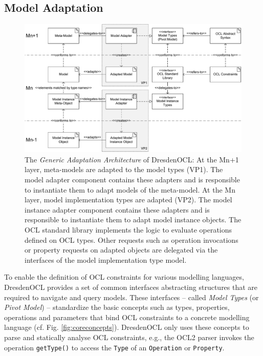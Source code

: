 \subsection{Model Adaptation}

	\begin{figure}[!t]
			\centering
				\includegraphics[width=1.00\textwidth]{figures/modeladaptation.pdf}
			\caption{The \emph{Generic Adaptation Architecture} of DresdenOCL: At the Mn+1 layer, meta-models are adapted
			to the model types (VP1). The model adapter component contains these adapters and is responsible 
			to instantiate them to adapt models of the meta-model. 
			At the Mn layer, model implementation types are adapted (VP2). The model instance adapter component
			contains these adapters and is responsible to instantiate them to adapt model instance objects. 
			The OCL standard library implements the logic to evaluate operations defined on OCL types. Other 
			requests such as operation invocations or property requests on adapted objects are delegated 
			via the interfaces of the model implementation type model.}
			\label{fig:modeladaptation}
		\end{figure}

	To enable the definition of OCL constraints for various modelling languages,
	DresdenOCL provides a set of common interfaces abstracting structures
	that are required to navigate and query models.
	These interfaces -- called \emph{Model Types} (or \emph{Pivot Model}) \cite{braeuerOCL07} -- standardize
	the basic	concepts such as types, properties, operations and parameters
	that bind OCL constraints to a concrete modelling language (cf. Fig. \ref{fig:coreconcepts}).
	DresdenOCL only	uses these concepts to parse and statically analyse OCL constraints, 
	e.g., the OCL2 parser	invokes the operation \texttt{getType()} to access the \texttt{Type} of 
	an \texttt{Operation} or \texttt{Property}.
	
